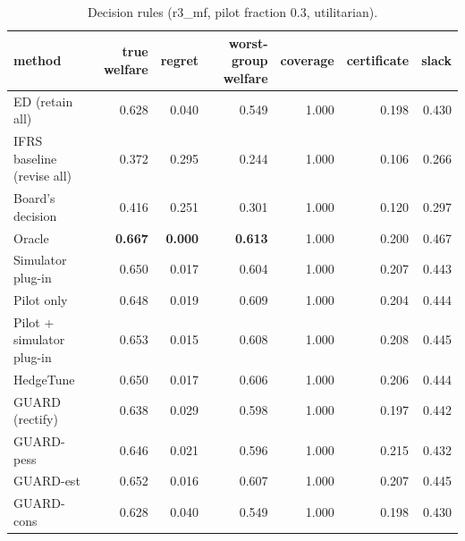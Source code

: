 \begin{table}[t]
\centering
\small
\begin{tabular}{lrrrrrr}
\toprule
method & true welfare & regret & worst-group welfare & coverage & certificate & slack \\
\midrule
ED (retain all) & 0.628 & 0.040 & 0.549 & 1.000 & 0.198 & 0.430 \\
IFRS baseline (revise all) & 0.372 & 0.295 & 0.244 & 1.000 & 0.106 & 0.266 \\
Board's decision & 0.416 & 0.251 & 0.301 & 1.000 & 0.120 & 0.297 \\
Oracle & \textbf{0.667} & \textbf{0.000} & \textbf{0.613} & 1.000 & 0.200 & 0.467 \\
Simulator plug-in & 0.650 & 0.017 & 0.604 & 1.000 & 0.207 & 0.443 \\
Pilot only & 0.648 & 0.019 & 0.609 & 1.000 & 0.204 & 0.444 \\
Pilot + simulator plug-in & 0.653 & 0.015 & 0.608 & 1.000 & 0.208 & 0.445 \\
HedgeTune & 0.650 & 0.017 & 0.606 & 1.000 & 0.206 & 0.444 \\
GUARD (rectify) & 0.638 & 0.029 & 0.598 & 1.000 & 0.197 & 0.442 \\
GUARD-pess & 0.646 & 0.021 & 0.596 & 1.000 & 0.215 & 0.432 \\
GUARD-est & 0.652 & 0.016 & 0.607 & 1.000 & 0.207 & 0.445 \\
GUARD-cons & 0.628 & 0.040 & 0.549 & 1.000 & 0.198 & 0.430 \\
\bottomrule
\end{tabular}
\caption{Decision rules (r3\_mf, pilot fraction 0.3, utilitarian).}
\label{tab:methods-utilitarian}
\end{table}
